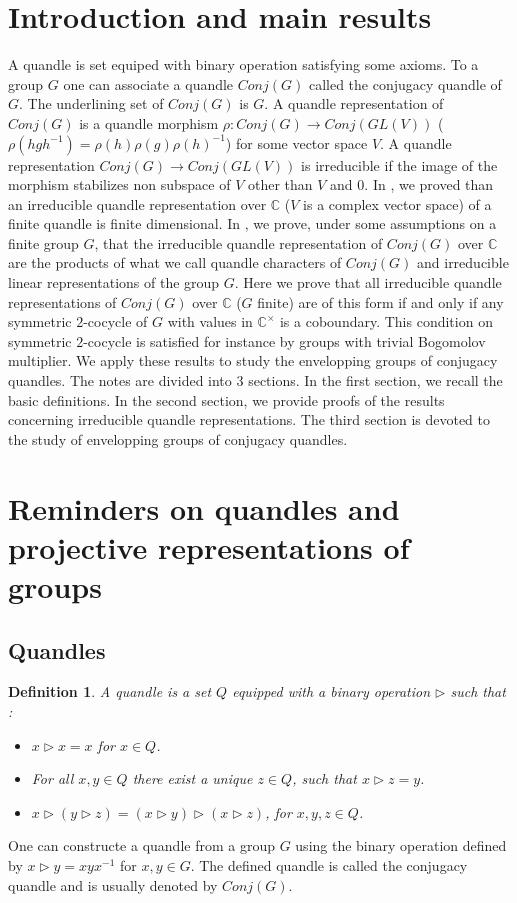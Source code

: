 \documentclass[12pt, reqno]{amsart}
\newtheorem{definition}[theorem]{Definition}
\begin{document}
\section*{Introduction and main results}
A quandle is set equiped with binary operation satisfying some axioms. To a group $G$ one can associate a quandle $Conj(G)$ called the conjugacy quandle of $G$. The underlining set of $Conj(G)$ is $G$. A quandle representation of $Conj(G)$ is a quandle morphism $\rho : Conj(G)\to Conj(GL(V))$ ($\rho(hgh^{-1})=\rho(h)\rho(g)\rho(h)^{-1}$) for some vector space $V$. A quandle representation $Conj(G)\to Conj(GL(V))$ is irreducible if the image of the morphism stabilizes non subspace of $V$ other than $V$ and $0$. In \cite{GQ}, we proved than an irreducible quandle representation over $\mathbb{C} $ ($V$ is a complex vector space) of a finite quandle is finite dimensional. In \cite{Qrep}, we prove, under some assumptions on a finite group $G$, that the irreducible quandle representation of $Conj(G)$ over $\mathbb{C}$ are the products of what we call quandle characters of $Conj(G)$ and irreducible linear representations of the group $G$. Here we prove that all irreducible quandle representations of $Conj(G)$ over $\mathbb{C}$ ($G$ finite) are of this form if and only if any symmetric $2$-cocycle of $G$ with values in $\mathbb{C}^\times$ is a coboundary. This condition on symmetric $2$-cocycle is satisfied for instance by groups with trivial Bogomolov multiplier.  We apply these results to study the envelopping groups of conjugacy quandles. The notes are divided into $3$ sections. In the first section, we recall the basic definitions. In the second section, we provide proofs of the results concerning irreducible quandle representations. The third section is devoted to the study of envelopping groups of conjugacy quandles.





\section{Reminders on quandles and projective representations of groups}
\subsection{Quandles}
\begin{definition}
 A quandle is a set $Q$ equipped with a binary operation $\triangleright$  such that :
\begin{itemize}
\item[-] $x\triangleright x=x$ for $x\in Q$.
\item[-] For all $x,y \in Q$ there exist a unique $z\in Q$, such that $x \triangleright z=y$.
\item[-] $x \triangleright( y\triangleright z)= (x \triangleright y) \triangleright (x \triangleright z)$, for $x,y,z \in Q$. 
\end{itemize}
\end{definition}
One can constructe a quandle from a group $G$ using the binary operation defined by $x\triangleright y= xyx^{-1}$  for $x,y\in G$. The defined quandle is called the conjugacy quandle and is usually denoted by $Conj(G)$.
\end{document}
